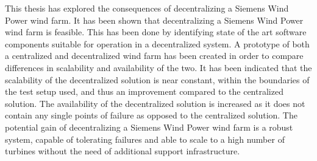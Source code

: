 This thesis has explored the consequences of decentralizing a Siemens Wind Power wind farm. It has been shown that decentralizing a Siemens Wind Power wind farm is feasible. This has been done by identifying state of the art software components suitable for operation in a decentralized system. A prototype of both a centralized and decentralized wind farm has been created in order to compare differences in scalability and availability of the two. It has been indicated that the scalability of the decentralized solution is near constant, within the boundaries of the test setup used, and thus an improvement compared to the centralized solution. The availability of the decentralized solution is increased as it does not contain any single points of failure as opposed to the centralized solution. The potential gain of decentralizing a Siemens Wind Power wind farm is a robust system, capable of tolerating failures and able to scale to a high number of turbines without the need of additional support infrastructure.